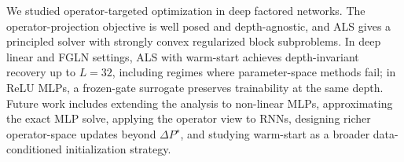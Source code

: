 \documentclass{article}
\begin{document}

We studied operator-targeted optimization in deep factored networks. The operator-projection objective is well posed and depth-agnostic, and ALS gives a principled solver with strongly convex regularized block subproblems. In deep linear and FGLN settings, ALS with warm-start achieves depth-invariant recovery up to $L=32$, including regimes where parameter-space methods fail; in ReLU MLPs, a frozen-gate surrogate preserves trainability at the same depth. Future work includes extending the analysis to non-linear MLPs, approximating the exact MLP solve, applying the operator view to RNNs, designing richer operator-space updates beyond $\Delta P^\star$, and studying warm-start as a broader data-conditioned initialization strategy.

\begin{ack}
\end{ack}




\end{document}
